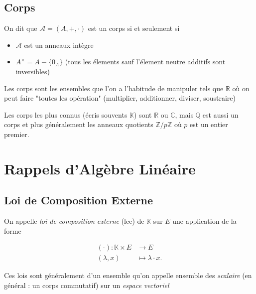 \documentclass[11pt,colorlinks]{book}
\theoremstyle{mytheoremstyle}
\theoremstyle{mytheoremstyle}
\theoremstyle{mytheoremstyle}
\theoremstyle{mytheoremstyle}
\theoremstyle{mytheoremstyle}
\theoremstyle{mytheoremstyle}
\theoremstyle{mytheoremstyle}
\theoremstyle{mytheoremstyle}
\theoremstyle{myproblemstyle}
\def\mbb#1{\mathbb{#1}}
\def\bC{\mbb{C}}
\def\bR{\mbb{R}}
\def\bQ{\mbb{Q}}
\def\bZ{\mbb{Z}}
\def\bK{\mbb{K}}
\newcommand{\vfunc}[5]{
  \begin{align*}
    #1 \colon #2 &\to #3\\
    #4 &\mapsto #5.
  \end{align*}
}
\begin{document}
\subsection{Corps}
\begin{definition}
  On dit que $\mathcal A = (A,+,\cdot)$ est un corps si et seulement si 
  \begin{itemize}
    \item $\mathcal A$ est un anneaux intègre 
    \item $A^{\times} = A - \{0_A\}$ (tous les élements sauf l'élement neutre additifs sont inversibles)
  \end{itemize}
\end{definition}
\begin{rmq}
  Les corps sont les ensembles que l'on a l'habitude de manipuler tels que $\bR$ où on peut faire "toutes les opération" (multiplier, additionner, diviser, soustraire)
\end{rmq}
\begin{ex}
  Les corps les plus connus (écris souvents $\bK$) sont $\bR$ ou $\bC$, mais $\bQ$ est aussi un corps et plus généralement les anneaux 
  quotients $\bZ/p\bZ$ où $p$ est un entier premier.
\end{ex}
\section{Rappels d'Algèbre Linéaire}
\subsection{Loi de Composition Externe}
\begin{definition}
  On appelle \textit{loi de composition externe} (lce) de $\bK$ sur $E$ une application de la forme 
  \vfunc{(\cdot)}{\bK \times E}{E}{(\lambda,x)}{\lambda \cdot x}
\end{definition}
\begin{rmq}
  Ces lois sont généralement d'un ensemble qu'on appelle ensemble des \textit{scalaire} (en général : un corps commutatif)
  sur un \textit{espace vectoriel}
\end{rmq}
\end{document}
